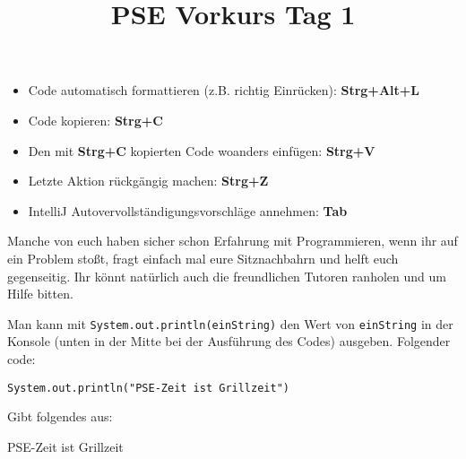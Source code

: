 \documentclass{../../sheet}
\title{PSE Vorkurs Tag 1}
\begin{document}
\maketitle

\begin{itemize}
    \item Code automatisch formattieren (z.B. richtig Einrücken): \textbf{Strg+Alt+L}
    \item Code kopieren: \textbf{Strg+C}
    \item Den mit \textbf{Strg+C} kopierten Code woanders einfügen: \textbf{Strg+V}
    \item Letzte Aktion rückgängig machen: \textbf{Strg+Z}
    \item IntelliJ Autovervollständigungsvorschläge annehmen: \textbf{Tab}
\end{itemize}
Manche von euch haben sicher schon Erfahrung mit Programmieren, wenn ihr auf ein Problem stoßt, fragt einfach mal eure Sitznachbahrn und helft euch gegenseitig. Ihr könnt natürlich auch die freundlichen Tutoren ranholen und um Hilfe bitten.
\newpage


Man kann mit \texttt{System.out.println(einString)} den Wert von \texttt{einString} in der Konsole (unten in der Mitte bei der Ausführung des Codes) ausgeben. Folgender code:
\begin{verbatim}
System.out.println("PSE-Zeit ist Grillzeit")
\end{verbatim}
Gibt folgendes aus:
\begin{ausgabe}
    PSE-Zeit ist Grillzeit
\end{ausgabe}
\end{document}
